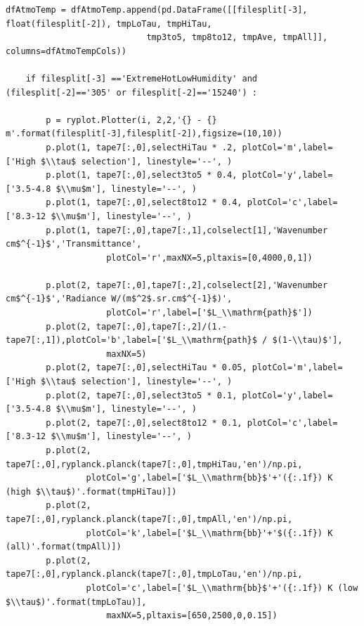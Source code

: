 \documentclass{workpackage}
\begin{document}
\begin{lstlisting}[style=incellstyle,caption={Code Listing in cell 21 \label{lst:autolistingcell21}}]
    dfAtmoTemp = dfAtmoTemp.append(pd.DataFrame([[filesplit[-3], float(filesplit[-2]), tmpLoTau, tmpHiTau, 
                            tmp3to5, tmp8to12, tmpAve, tmpAll]], columns=dfAtmoTempCols))

    if filesplit[-3] =='ExtremeHotLowHumidity' and (filesplit[-2]=='305' or filesplit[-2]=='15240') :

        p = ryplot.Plotter(i, 2,2,'{} - {} m'.format(filesplit[-3],filesplit[-2]),figsize=(10,10))
        p.plot(1, tape7[:,0],selectHiTau * .2, plotCol='m',label=['High $\\tau$ selection'], linestyle='--', )
        p.plot(1, tape7[:,0],select3to5 * 0.4, plotCol='y',label=['3.5-4.8 $\\mu$m'], linestyle='--', )
        p.plot(1, tape7[:,0],select8to12 * 0.4, plotCol='c',label=['8.3-12 $\\mu$m'], linestyle='--', )
        p.plot(1, tape7[:,0],tape7[:,1],colselect[1],'Wavenumber cm$^{-1}$','Transmittance',
                    plotCol='r',maxNX=5,pltaxis=[0,4000,0,1])
        
        p.plot(2, tape7[:,0],tape7[:,2],colselect[2],'Wavenumber cm$^{-1}$','Radiance W/(m$^2$.sr.cm$^{-1}$)',
                    plotCol='r',label=['$L_\\mathrm{path}$'])
        p.plot(2, tape7[:,0],tape7[:,2]/(1.-tape7[:,1]),plotCol='b',label=['$L_\\mathrm{path}$ / $(1-\\tau)$'], 
                    maxNX=5)
        p.plot(2, tape7[:,0],selectHiTau * 0.05, plotCol='m',label=['High $\\tau$ selection'], linestyle='--', )
        p.plot(2, tape7[:,0],select3to5 * 0.1, plotCol='y',label=['3.5-4.8 $\\mu$m'], linestyle='--', )
        p.plot(2, tape7[:,0],select8to12 * 0.1, plotCol='c',label=['8.3-12 $\\mu$m'], linestyle='--', )
        p.plot(2, tape7[:,0],ryplanck.planck(tape7[:,0],tmpHiTau,'en')/np.pi,
                plotCol='g',label=['$L_\\mathrm{bb}$'+'({:.1f}) K (high $\\tau$)'.format(tmpHiTau)])
        p.plot(2, tape7[:,0],ryplanck.planck(tape7[:,0],tmpAll,'en')/np.pi,
                plotCol='k',label=['$L_\\mathrm{bb}'+'$({:.1f}) K (all)'.format(tmpAll)])
        p.plot(2, tape7[:,0],ryplanck.planck(tape7[:,0],tmpLoTau,'en')/np.pi,
                plotCol='c',label=['$L_\\mathrm{bb}$'+'({:.1f}) K (low  $\\tau$)'.format(tmpLoTau)], 
                    maxNX=5,pltaxis=[650,2500,0,0.15])        
        

\end{lstlisting}
\end{document}
